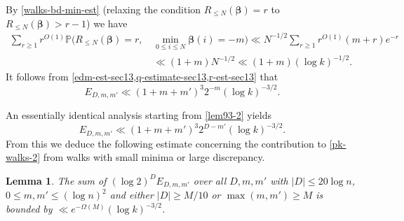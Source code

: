 \documentclass[11pt,reqno]{amsart}
\numberwithin{equation}{section}
\newtheorem{lemma}[theorem]{Lemma}
\theoremstyle{definition}
\theoremstyle{remark}
\newcommand{\mb}{\mathbb}
\def\boldbeta{\boldsymbol\beta}
\renewcommand{\le}{\leqslant}
\renewcommand{\ge}{\geqslant}
\begin{document}
By \cref{walks-bd-min-est} (relaxing the condition $R_{\le N}(\boldbeta) = r$ to $R_{\le N}(\boldbeta) > r - 1$) we have
\begin{align}\nonumber \sum_{r \ge 1} r^{O(1)}  \mb{P}\big( R_{\le N}(\boldbeta) = r, \, & \min_{0 \le i \le N} \boldbeta(i) = -m\big) \ll N^{-1/2} \sum_{r \ge 1} r^{O(1)}(m + r) e^{-r} \\ & \ll (1 + m) N^{-1/2} \ll (1 + m) (\log k)^{-1/2}.\label{r-est-sec13}\end{align}
It follows from \cref{edm-est-sec13,q-estimate-sec13,r-est-sec13} that 
\begin{equation}\label{edm1a} E_{D,m,m'}   \ll (1 + m + m')^{3} 2^{-m} (\log k)^{-3/2} .\end{equation} 


An essentially identical analysis starting from \cref{lem93-2} yields
\begin{equation}\label{edm2} E_{D,m,m'}   \ll (1+ m + m')^3 2^{D-m'} (\log k)^{-3/2} .\end{equation}
From this we deduce the following estimate concerning the contribution to \cref{pk-walks-2} from walks with small minima or large discrepancy.
\begin{lemma}
The sum of $(\log 2)^D E_{D,m,m'}$ over all $D, m,m'$ with $|D| \le 20 \log n$, $0 \le m, m' \le (\log n)^2$ and either $|D| \ge M/10$ or $\max(m,m') \ge M$ is bounded by $\ll  e^{-\Omega(M)} (\log k)^{-3/2}$.
\end{lemma}
\end{document}
